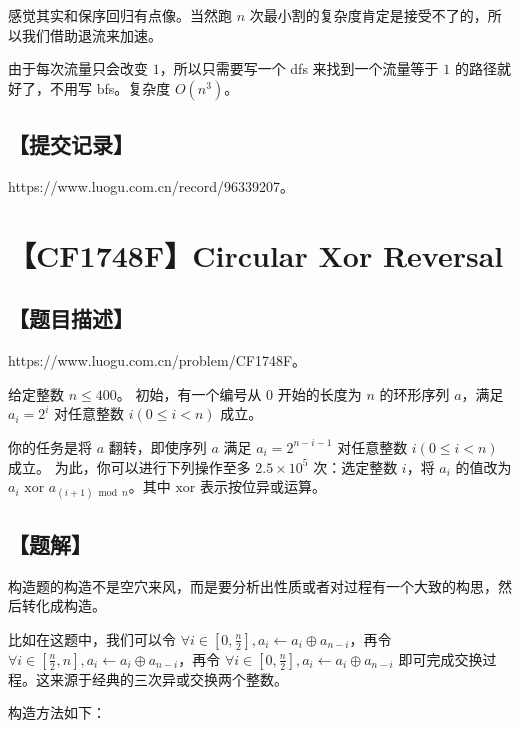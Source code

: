 \documentclass[UTF8,12pt,a4paper]{ctexart}
\begin{document}
	感觉其实和保序回归有点像。当然跑 $n$ 次最小割的复杂度肯定是接受不了的，所以我们借助退流来加速。
	
	由于每次流量只会改变 $1$，所以只需要写一个 dfs 来找到一个流量等于 $1$ 的路径就好了，不用写 bfs。复杂度 $O(n^3)$。
	
	\subsection*{【提交记录】}
	
	https://www.luogu.com.cn/record/96339207。
	
	
	\section*{【CF1748F】Circular Xor Reversal}
	
	\subsection*{【题目描述】}
	
	https://www.luogu.com.cn/problem/CF1748F。
	
	给定整数 $n\le 400$。  
	初始，有一个编号从 $0$ 开始的长度为 $n$ 的环形序列 $a$，满足 $a_i=2^i$ 对任意整数 $i(0\leq i<n)$ 成立。  
	
	你的任务是将 $a$ 翻转，即使序列 $a$ 满足 $a_i=2^{n-i-1}$ 对任意整数 $i(0\leq i<n)$ 成立。  
	为此，你可以进行下列操作至多 $2.5\times10^5$ 次：选定整数 $i$，将 $a_i$ 的值改为 $a_i\text{ xor }a_{(i+1)\bmod n}$。其中 $\text{xor}$ 表示按位异或运算。
	
	\subsection*{【题解】}
	
	构造题的构造不是空穴来风，而是要分析出性质或者对过程有一个大致的构思，然后转化成构造。
	
	比如在这题中，我们可以令 $\forall i\in[0,\frac n2],a_i\leftarrow a_i\oplus a_{n-i}$，再令 $\forall i\in[\frac n2, n],a_i\leftarrow a_i\oplus a_{n-i}$，再令 $\forall i\in[0,\frac n2],a_i\leftarrow a_i\oplus a_{n-i}$ 即可完成交换过程。这来源于经典的三次异或交换两个整数。
	
	构造方法如下：
	
\end{document}
